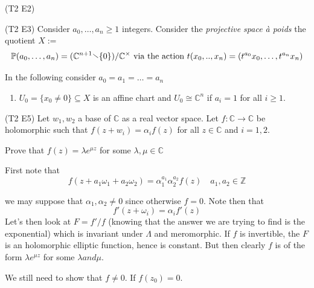 \begin{eser}{(T2 E2)}
\begin{enumerate}[label = (\arabic*)]
\end{enumerate}
\end{eser}

\begin{eser}{(T2 E3)}
    Consider \(a_{0}, \dots, a_{n} \ge 1\) integers. Consider the
    \emph{projective space à poids} the quotient \(X := \) 
    \[
      \mathbb{P}{(a_{0}, \dots, a_{n})} = {(\mathbb{C}^{n+1} \sminus \{0\} )} /
      \mathbb{C}^{\times } \text{ via the action } t{(x_{0}, .., x_{n})} = {(t
      ^{a_{0}} x_{0}, \dots, t ^{a_{n}} x_{n})}
    \]

    In the following consider \(a_{0} = a_{1} = \dots = a_{n}\) 

\begin{enumerate}[label = (\arabic*)]
    \item \(U_{0} = \{x_{0} \neq 0 \} \subseteq X \) is an affine chart and
        \(U_{0} \cong \mathbb{C}^{n}\) if \(a_{i} = 1\) for all \(i \ge  1\).
\end{enumerate}

\end{eser}

\begin{eser}{(T2 E5)}
    Let \(w_{1}, w_{2}\) a base of \(\mathbb{C}\) as a real vector space. Let
    \(f : \mathbb{C} \to \mathbb{C}\) be holomorphic such that \(f{(z + w_{i})}
    = \alpha_{i} f{(z)}\) for all \(z \in \mathbb{C}\) and \(i = 1, 2\). 

    Prove that \(f{(z)} = \lambda e^{\mu z}\) for some \(\lambda, \mu \in \mathbb{C}\) 

    \tcblower

    First note that
    \[
      f{(z + a_{1}\omega_{1} + a_{2}\omega_{2})} = \alpha_{1}^{a_{1}}
      \alpha_{2}^{a_{2}} f{(z)} \quad a_{1}, a_{2} \in \mathbb{Z}
    \]

    we may suppose that \(\alpha_{1}, \alpha_{2} \neq 0\) since otherwise \(f =
    0\). Note then that
    \[
      f'{(z + \omega_{i})} = \alpha_{i}f'{(z)}
    \]
    Let's then look at \(F = f'/f\) (knowing that the answer we are trying to find
    is the exponential) which is invariant under \(\Lambda\) and meromorphic. If
    \(f\) is invertible, the \(F\) is an holomorphic elliptic function, hence is
    constant. But then clearly \(f\) is of the form \(\lambda e ^{\mu z}\) for
    some \(\lambda and \mu\).

    We still need to show that \(f \neq 0\). If \(f{(z_{0})} = 0\). 
\end{eser}

